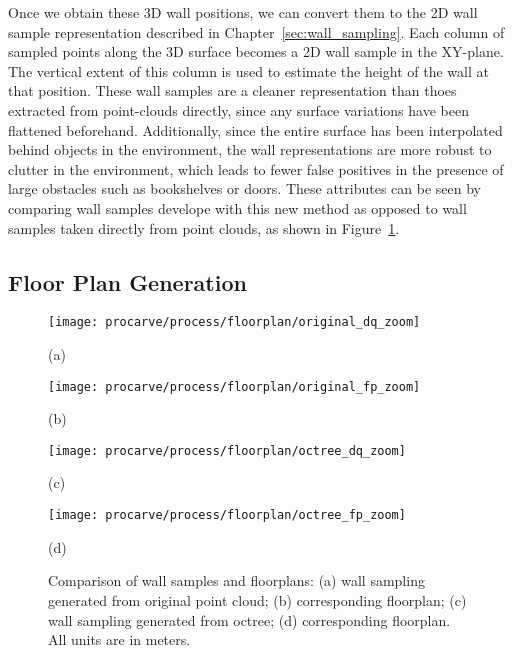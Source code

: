 \documentclass[12pt,onecolumn,oneside]{book}
\begin{document}
Once we obtain these 3D wall positions, we can convert them to the 2D wall sample representation described in Chapter~\ref{sec:wall_sampling}.  Each column of sampled points along the 3D surface becomes a 2D wall sample in the XY-plane.  The vertical extent of this column is used to estimate the height of the wall at that position.  These wall samples are a cleaner representation than thoes extracted from point-clouds directly, since any surface variations have been flattened beforehand.  Additionally, since the entire surface has been interpolated behind objects in the environment, the wall representations are more robust to clutter in the environment, which leads to fewer false positives in the presence of large obstacles such as bookshelves or doors.  These attributes can be seen by comparing wall samples develope with this new method as opposed to wall samples taken directly from point clouds, as shown in Figure~\ref{fig:octree_fp_compare}.

\subsection{Floor Plan Generation}
\label{ssec:octree_floorplan}

\begin{figure}

	\begin{minipage}[t]{0.45\linewidth}
		\centerline{\texttt{[image: procarve/process/floorplan/original\_dq\_zoom]}}
		\centerline{(a)}
	\end{minipage}
	\hfill
	\begin{minipage}[t]{0.45\linewidth}
		\centerline{\texttt{[image: procarve/process/floorplan/original\_fp\_zoom]}}
		\centerline{(b)}
	\end{minipage}
	
	\begin{minipage}[t]{0.45\linewidth}
		\centerline{\texttt{[image: procarve/process/floorplan/octree\_dq\_zoom]}}
		\centerline{(c)}
	\end{minipage}
	\hfill
	\begin{minipage}[t]{0.45\linewidth}
		\centerline{\texttt{[image: procarve/process/floorplan/octree\_fp\_zoom]}}
		\centerline{(d)}
	\end{minipage}

	\caption[Comparison of wall samples and floor plans.]{Comparison of wall samples and floorplans: (a) wall sampling generated from original point cloud; (b) corresponding floorplan; (c) wall sampling generated from octree; (d) corresponding floorplan.  All units are in meters.}
	\label{fig:octree_fp_compare}
\end{figure}
\end{document}
